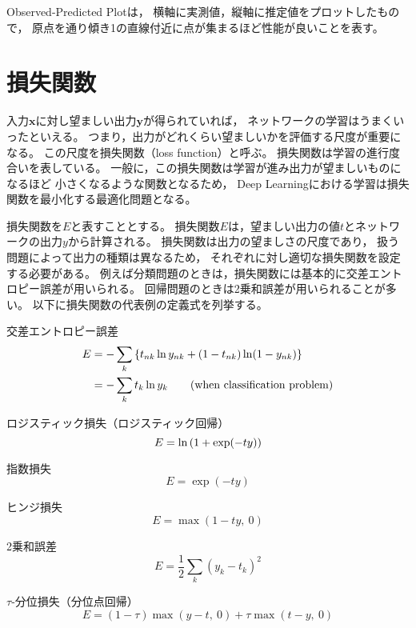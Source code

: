 \documentclass[class=jsarticle, crop=false, dvipdfmx, fleqn]{standalone}
\begin{document}
Observed-Predicted Plotは，
横軸に実測値，縦軸に推定値をプロットしたもので，
原点を通り傾き1の直線付近に点が集まるほど性能が良いことを表す。



\section{損失関数}
\label{sec:loss_function}

入力$\bm{x}$に対し望ましい出力$\bm{y}$が得られていれば，
ネットワークの学習はうまくいったといえる。
つまり，出力がどれくらい望ましいかを評価する尺度が重要になる。
この尺度を損失関数（loss function）と呼ぶ。
損失関数は学習の進行度合いを表している。
一般に，この損失関数は学習が進み出力が望ましいものになるほど
小さくなるような関数となるため，
Deep Learningにおける学習は損失関数を最小化する最適化問題となる。

損失関数を$E$と表すこととする。
損失関数$E$は，望ましい出力の値$t$とネットワークの出力$y$から計算される。
損失関数は出力の望ましさの尺度であり，
扱う問題によって出力の種類は異なるため，
それぞれに対し適切な損失関数を設定する必要がある。
例えば分類問題のときは，損失関数には基本的に交差エントロピー誤差が用いられる。
回帰問題のときは2乗和誤差が用いられることが多い。
以下に損失関数の代表例の定義式を列挙する。

交差エントロピー誤差
\begin{align}
E & = - \sum_k \qty{ t_{nk} \ln y_{nk} + (1 - t_{nk}) \ln (1 - y_{nk}) } \\
	& =  - \sum_k t_k \ln y_k  \qquad (\text{when classification problem})
\end{align}

ロジスティック損失（ロジスティック回帰）
\begin{equation}
E = \ln\qty(1 + \exp(-ty))
\end{equation}

指数損失
\begin{equation}
E = \exp(-ty)
\end{equation}

ヒンジ損失
\begin{equation}
E = \max(1 - ty,\ 0)
\end{equation}

2乗和誤差
\begin{equation}
E = \frac{1}{2} \sum_k (y_k - t_k)^2
\end{equation}

$\tau$-分位損失（分位点回帰）
\begin{equation}
E = (1 - \tau) \max(y-t,\ 0) + \tau \max(t-y,\ 0)
\end{equation}
\end{document}
